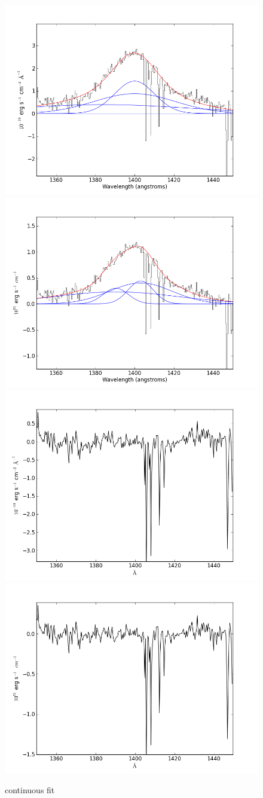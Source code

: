 \documentclass[usenatbib]{mn2e}
\begin{document}
\begin{figure}
\begin{center}
\includegraphics[width=0.46\linewidth,angle=0]{SiIV_0.png}
\vspace{5mm}
\includegraphics[width=0.49\linewidth,angle=0]{SiIV_1.png}\\
\includegraphics[width=0.46\linewidth,angle=0]{SiIV_res_0.png}
\hspace{5mm}
\includegraphics[width=0.49\linewidth,angle=0]{SiIV_res_1.png}\\
\end{center} 
\caption{continuous fit \label{fig:landscape}}   
\end{figure}
\end{document}
